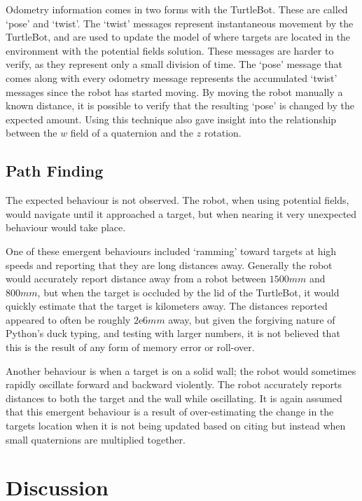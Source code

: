 \documentclass{article}[12]
\begin{document}
Odometry information comes in two forms with the TurtleBot. These are called `pose' and `twist'. The `twist' messages represent instantaneous movement by the TurtleBot, and are used to update the model of where targets are located in the environment with the potential fields solution. These messages are harder to verify, as they represent only a small division of time. The `pose' message that comes along with every odometry message represents the accumulated `twist' messages since the robot has started moving. By moving the robot manually a known distance, it is possible to verify that the resulting `pose' is changed by the expected amount. Using this technique also gave insight into the relationship between the $w$ field of a quaternion and the $z$ rotation.

\subsection{Path Finding}

The expected behaviour is not observed. The robot, when using potential fields, would navigate until it approached a target, but when nearing it very unexpected behaviour would take place. 

One of these emergent behaviours included `ramming' toward targets at high speeds and reporting that they are long distances away. Generally the robot would accurately report distance away from a robot between $1500mm$ and $800mm$, but when the target is occluded by the lid of the TurtleBot, it would quickly estimate that the target is kilometers away. The distances reported appeared to often be roughly $2\mathrm{e}{6}mm$ away, but given the forgiving nature of Python's duck typing, and testing with larger numbers, it is not believed that this is the result of any form of memory error or roll-over. 

Another behaviour is when a target is on a solid wall; the robot would sometimes rapidly oscillate forward and backward violently. The robot accurately reports distances to both the target and the wall while oscillating. It is again assumed that this emergent behaviour is a result of over-estimating the change in the targets location when it is not being updated based on citing but instead when small quaternions are multiplied together.  

\section{Discussion}
\end{document}
